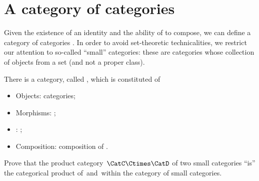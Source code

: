 \section{A category of categories}

Given the existence of an identity  and the ability of  to compose, we can define a category of categories \Category.
In order to avoid set-theoretic technicalities, we restrict our attention to so-called ``small'' categories: these are categories whose collection of objects from a set (and not a proper class).

\begin{ctdefinition}
    \label{def:Category}
    There is a category, called \Category, which is constituted of
    \begin{itemize}
        \item Objects: categories;
        \item Morphisms: ;
        \item {}: ;
        \item Composition: composition of .
    \end{itemize}
\end{ctdefinition}
\vfill
\begin{gradedexercise}
    Prove that the product category~$\CatC \Ctimes \CatD$ of two small categories ``is'' the categorical product of~\CatC and~\CatD within the category of small categories.
\end{gradedexercise}
